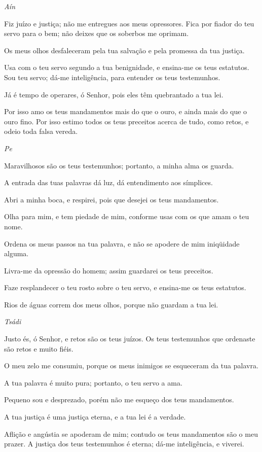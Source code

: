 \bigskip
\centerline{\emph{Aín}}

Fiz juízo e justiça; não me entregues aos meus opressores.
Fica por fiador do teu servo para o bem; não deixes que os
soberbos me oprimam.

Os meus olhos desfaleceram pela tua salvação e pela promessa da
tua justiça.

Usa com o teu servo segundo a tua benignidade, e ensina-me os
teus estatutos. Sou teu servo; dá-me inteligência, para
entender os teus testemunhos.

Já é tempo de operares, ó Senhor, pois eles têm quebrantado a
tua lei.

Por isso amo os teus mandamentos mais do que o ouro, e ainda
mais do que o ouro fino. Por isso estimo todos os teus
preceitos acerca de tudo, como retos, e odeio toda falsa vereda.

\bigskip
\centerline{\emph{Pe}}

Maravilhosos são os teus testemunhos; portanto, a minha alma os
guarda.

A entrada das tuas palavras dá luz, dá entendimento aos
símplices.

Abri a minha boca, e respirei, pois que desejei os teus
mandamentos.

Olha para mim, e tem piedade de mim, conforme usas com os que
amam o teu nome.

Ordena os meus passos na tua palavra, e não se apodere de mim
iniqüidade alguma.

Livra-me da opressão do homem; assim guardarei os teus
preceitos.

Faze resplandecer o teu rosto sobre o teu servo, e ensina-me os
teus estatutos.

Rios de águas correm dos meus olhos, porque não guardam a tua
lei.

\bigskip
\centerline{\emph{Tsádi}}

Justo és, ó Senhor, e retos são os teus juízos. Os teus
testemunhos que ordenaste são retos e muito fiéis.

O meu zelo me consumiu, porque os meus inimigos se esqueceram da
tua palavra.

A tua palavra é muito pura; portanto, o teu servo a ama.

Pequeno sou e desprezado, porém não me esqueço dos teus
mandamentos.

A tua justiça é uma justiça eterna, e a tua lei é a verdade.

Aflição e angústia se apoderam de mim; contudo os teus
mandamentos são o meu prazer. A justiça dos teus testemunhos
é eterna; dá-me inteligência, e viverei.

